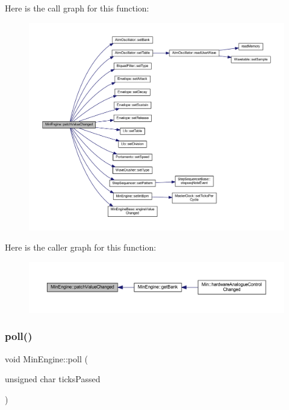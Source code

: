 Here is the call graph for this function\+:
\nopagebreak
\begin{figure}[H]
\begin{center}
\leavevmode
\includegraphics[width=350pt]{d4/d0f/class_min_engine_a229d4b913277a48909bf1aa01176ae1f_cgraph}
\end{center}
\end{figure}
Here is the caller graph for this function\+:
\nopagebreak
\begin{figure}[H]
\begin{center}
\leavevmode
\includegraphics[width=350pt]{d4/d0f/class_min_engine_a229d4b913277a48909bf1aa01176ae1f_icgraph}
\end{center}
\end{figure}
\mbox{\label{class_min_engine_af0b91eca44954cb677808c3d24659596}} 
\subsubsection{\texorpdfstring{poll()}{poll()}}
{\footnotesize\ttfamily void Min\+Engine\+::poll (\begin{DoxyParamCaption}\item[{unsigned char}]{ticks\+Passed }\end{DoxyParamCaption})}



